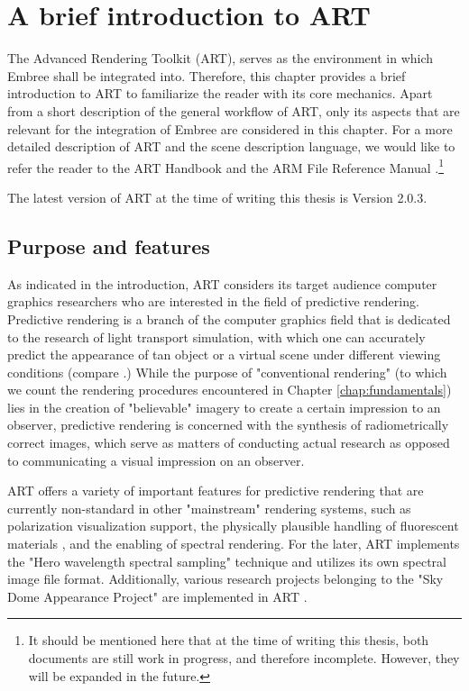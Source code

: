 \chapter{A brief introduction to ART}
The Advanced Rendering Toolkit (ART), serves as the environment in which Embree shall be integrated into. Therefore, this chapter provides a brief introduction to ART to familiarize the reader with its core mechanics. Apart from a short description of the general workflow of ART, only its aspects that are relevant for the integration of Embree are considered in this chapter. For a more detailed description of ART and the scene description language, we would like to refer the reader to the ART Handbook \cite{arthandbook} and the ARM File Reference Manual \cite{artreferencemanual}.\footnote{It should be mentioned here that at the time of writing this thesis, both documents are still work in progress, and therefore incomplete. However, they will be expanded in the future.}

The latest version of ART at the time of writing this thesis is Version 2.0.3.


\section{Purpose and features}

As indicated in the introduction, ART considers its target audience computer graphics researchers who are interested in the field of predictive rendering. Predictive rendering is a branch of the computer graphics field that is dedicated to the research of light transport simulation, with which one can accurately predict the appearance of tan object or a virtual scene under different viewing conditions (compare \cite{wilkie2009predictive}.)  While the purpose of "conventional rendering" (to which we count the rendering procedures encountered in Chapter \ref{chap:fundamentals}) lies in the creation of "believable" imagery to create a certain impression to an observer, predictive rendering is concerned with the synthesis of radiometrically correct images, which serve as matters of conducting actual research as opposed to communicating a visual impression on an observer.

ART offers a variety of important features for predictive rendering that are currently non-standard in other "mainstream" rendering systems, such as polarization visualization support, the physically plausible handling of fluorescent materials \cite{mojzik2018handling}, and the enabling of spectral rendering. For the later, ART implements the "Hero wavelength spectral sampling" technique \cite{wilkie2014hero} and utilizes its own spectral image file format. Additionally, various research projects belonging to the "Sky Dome Appearance Project" are implemented in ART \cite{hosek2012analytic, hovsek2013adding, wilkie2013predicting}.


